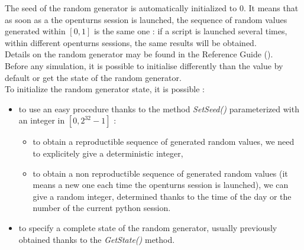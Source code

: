 \renewcommand{\filename}{docUC_RandomGenerator.tex}
\renewcommand{\filetitle}{UC : Parametrisation of the Random Generator}

\HeaderIILevel

\label{randomGenerator}



The seed of the random generator is automatically initialized to 0. It means that as soon as a the openturns session is launched, the sequence of random values generated within $[0,1]$ is the same one : if a script is launched several times, within different openturns sessions, the same results will be obtained. \\


Details on the random generator may be found in the Reference Guide ().\\


Before any simulation, it is possible to initialise differently than the value by default or get the state of the random generator. \\
To initialize the random generator state, it is possible :
\begin{itemize}
\item to use an easy procedure thanks to the method {\itshape SetSeed()}  parameterized with an integer in $[0, 2^{32}-1]$ :
  \begin{itemize}
  \item to obtain a reproductible sequence of generated random values, we need to explicitely give a deterministic integer,
  \item to obtain a non reproductible sequence of generated random values (it means a new one each time the openturns session is launched), we can give a random integer, determined thanks to the time of the day or the number of the current python session.
  \end{itemize}
\item to specify a complete state of the random generator, usually previously obtained thanks to the {\itshape GetState()} method.
\end{itemize}


